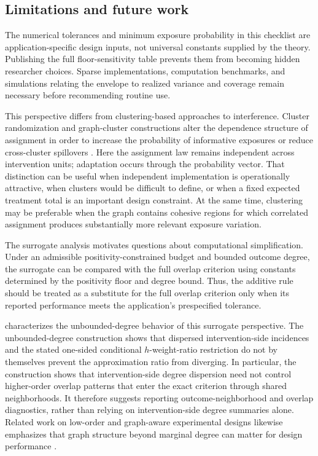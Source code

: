 \documentclass[11pt]{article}
\begin{document}
\subsection{Limitations and future work}

The numerical tolerances and minimum exposure probability in this checklist are application-specific design inputs, not universal constants supplied by the theory. Publishing the full floor-sensitivity table prevents them from becoming hidden researcher choices. Sparse implementations, computation benchmarks, and simulations relating the envelope to realized variance and coverage remain necessary before recommending routine use.

This perspective differs from clustering-based approaches to interference. Cluster randomization and graph-cluster constructions alter the dependence structure of assignment in order to increase the probability of informative exposures or reduce cross-cluster spillovers \citep{EcklesKarrerUgander2017,UganderYin2020RandomizedGCR,BrennanMirrokniPougetAbadie2022ClusterBipartite}. Here the assignment law remains independent across intervention units; adaptation occurs through the probability vector. That distinction can be useful when independent implementation is operationally attractive, when clusters would be difficult to define, or when a fixed expected treatment total is an important design constraint. At the same time, clustering may be preferable when the graph contains cohesive regions for which correlated assignment produces substantially more relevant exposure variation.

The surrogate analysis motivates questions about computational simplification. Under an admissible positivity-constrained budget and bounded outcome degree, the surrogate can be compared with the full overlap criterion using constants determined by the positivity floor and degree bound. Thus, the additive rule should be treated as a substitute for the full overlap criterion only when its reported performance meets the application's prespecified tolerance.

 characterizes the unbounded-degree behavior of this surrogate perspective. The unbounded-degree construction shows that dispersed intervention-side incidences and the stated one-sided conditional \(h\)-weight-ratio restriction do not by themselves prevent the approximation ratio from diverging. In particular, the construction shows that intervention-side degree dispersion need not control higher-order overlap patterns that enter the exact criterion through shared neighborhoods. It therefore suggests reporting outcome-neighborhood and overlap diagnostics, rather than relying on intervention-side degree summaries alone. Related work on low-order and graph-aware experimental designs likewise emphasizes that graph structure beyond marginal degree can matter for design performance \citep{EichhornKhanUganderYu2024LowOrderClusteredDesigns,HarshawSavjeEisenstatMirrokniPougetAbadie2021BipartiteERL}.
\end{document}
